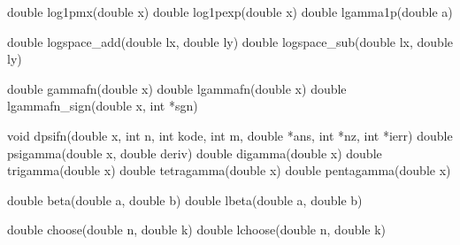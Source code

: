 \documentclass[]{book}
\newenvironment{Shaded}{\begin{snugshade}}{\end{snugshade}}
\newcommand{\DataTypeTok}[1]{\textcolor[rgb]{0.13,0.29,0.53}{#1}}
\newcommand{\NormalTok}[1]{#1}
\begin{document}
\begin{Shaded}
\begin{Highlighting}[]
\DataTypeTok{double}\NormalTok{ log1pmx(}\DataTypeTok{double}\NormalTok{ x)                  }
\DataTypeTok{double}\NormalTok{ log1pexp(}\DataTypeTok{double}\NormalTok{ x)                 }
\DataTypeTok{double}\NormalTok{ lgamma1p(}\DataTypeTok{double}\NormalTok{ a)                 }

\DataTypeTok{double}\NormalTok{ logspace_add(}\DataTypeTok{double}\NormalTok{ lx, }\DataTypeTok{double}\NormalTok{ ly) }
\DataTypeTok{double}\NormalTok{ logspace_sub(}\DataTypeTok{double}\NormalTok{ lx, }\DataTypeTok{double}\NormalTok{ ly) }


\DataTypeTok{double}\NormalTok{ gammafn(}\DataTypeTok{double}\NormalTok{ x)            }
\DataTypeTok{double}\NormalTok{ lgammafn(}\DataTypeTok{double}\NormalTok{ x)           }
\DataTypeTok{double}\NormalTok{ lgammafn_sign(}\DataTypeTok{double}\NormalTok{ x, }\DataTypeTok{int}\NormalTok{ *sgn)    }

\DataTypeTok{void}\NormalTok{   dpsifn(}\DataTypeTok{double}\NormalTok{ x, }\DataTypeTok{int}\NormalTok{ n, }\DataTypeTok{int}\NormalTok{ kode, }\DataTypeTok{int}\NormalTok{ m, }\DataTypeTok{double}\NormalTok{ *ans, }\DataTypeTok{int}\NormalTok{ *nz, }\DataTypeTok{int}\NormalTok{ *ierr)    }
\DataTypeTok{double}\NormalTok{ psigamma(}\DataTypeTok{double}\NormalTok{ x, }\DataTypeTok{double}\NormalTok{ deriv) }
\DataTypeTok{double}\NormalTok{ digamma(}\DataTypeTok{double}\NormalTok{ x)    }
\DataTypeTok{double}\NormalTok{ trigamma(}\DataTypeTok{double}\NormalTok{ x)   }
\DataTypeTok{double}\NormalTok{ tetragamma(}\DataTypeTok{double}\NormalTok{ x) }
\DataTypeTok{double}\NormalTok{ pentagamma(}\DataTypeTok{double}\NormalTok{ x) }

\DataTypeTok{double}\NormalTok{ beta(}\DataTypeTok{double}\NormalTok{ a, }\DataTypeTok{double}\NormalTok{ b) }
\DataTypeTok{double}\NormalTok{ lbeta(}\DataTypeTok{double}\NormalTok{ a, }\DataTypeTok{double}\NormalTok{ b)    }

\DataTypeTok{double}\NormalTok{ choose(}\DataTypeTok{double}\NormalTok{ n, }\DataTypeTok{double}\NormalTok{ k)   }
\DataTypeTok{double}\NormalTok{ lchoose(}\DataTypeTok{double}\NormalTok{ n, }\DataTypeTok{double}\NormalTok{ k)  }


\end{Highlighting}
\end{Shaded}
\end{document}
